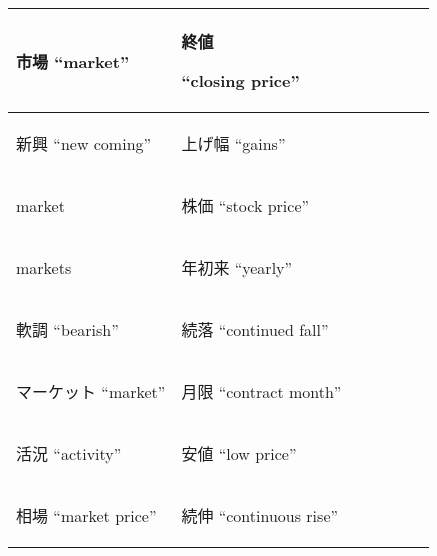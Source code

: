 \begin{table}[tb]
\vspace{-1ex}
 \small
 \centering
  \begin{tabular}{|l|l|l|l|p{2cm}|p{2.5cm}|p{2.5cm}|}
  \hline
 \begin{CJK}{UTF8}{ipxm}市場 ``market''      \end{CJK}&\begin{CJK}{UTF8}{ipxm}終値\end{CJK} ``closing price'' \\\hline\hline
 \begin{CJK}{UTF8}{ipxm}新興 ``new coming''  \end{CJK}&\begin{CJK}{UTF8}{ipxm}上げ幅 ``gains''         \end{CJK}\\
 \begin{CJK}{UTF8}{ipxm}market               \end{CJK}&\begin{CJK}{UTF8}{ipxm}株価 ``stock price''     \end{CJK}\\
 \begin{CJK}{UTF8}{ipxm}markets              \end{CJK}&\begin{CJK}{UTF8}{ipxm}年初来 ``yearly''        \end{CJK}\\
 \begin{CJK}{UTF8}{ipxm}軟調 ``bearish''     \end{CJK}&\begin{CJK}{UTF8}{ipxm}続落 ``continued fall''  \end{CJK}\\
 \begin{CJK}{UTF8}{ipxm}マーケット ``market''\end{CJK}&\begin{CJK}{UTF8}{ipxm}月限 ``contract month''  \end{CJK}\\
 \begin{CJK}{UTF8}{ipxm}活況 ``activity''    \end{CJK}&\begin{CJK}{UTF8}{ipxm}安値 ``low price''       \end{CJK}\\
 \begin{CJK}{UTF8}{ipxm}相場 ``market price''\end{CJK}&\begin{CJK}{UTF8}{ipxm}続伸 ``continuous rise'' \end{CJK}\\

\end{tabular}
\end{table}

